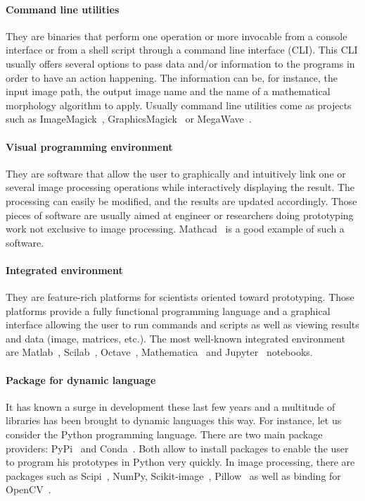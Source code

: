 \paragraph{Command line utilities} They are binaries that perform one operation or more invocable from a console
interface or from a shell script through a command line interface (CLI). This CLI usually offers several options to pass
data and/or information to the programs in order to have an action happening. The information can be, for instance, the
input image path, the output image name and the name of a mathematical morphology algorithm to apply. Usually command
line utilities come as projects such as ImageMagick~\parencite{imagemagick.2021},
GraphicsMagick~\parencite{graphicsmagick.2021} or MegaWave~\parencite{froment.2012.megawave,froment.2004.megawave2}.

\paragraph{Visual programming environment} They are software that allow the user to graphically and intuitively link one
or several image processing operations while interactively displaying the result. The processing can easily be modified,
and the results are updated accordingly. Those pieces of software are usually aimed at engineer or researchers doing
prototyping work not exclusive to image processing. Mathcad~\parencite{ptc.2019.mathcad} is a good example of such a
software.

\paragraph{Integrated environment} They are feature-rich platforms for scientists oriented toward prototyping. Those
platforms provide a fully functional programming language and a graphical interface allowing the user to run commands
and scripts as well as viewing results and data (image, matrices, etc.). The most well-known integrated environment
are Matlab~\parencite{mathworks.2020.matlab}, Scilab~\parencite{scilab.2020}, Octave~\parencite{gnu.2021.octave},
Mathematica~\parencite{wolfram.2020.mathematica} and Jupyter~\parencite{kluyver.2016.jupyter} notebooks.

\paragraph{Package for dynamic language} It has known a surge in development these last few years and a multitude of
libraries has been brought to dynamic languages this way. For instance, let us consider the Python programming language.
There are two main package providers: PyPi~\parencite{pypi.2021} and Conda~\parencite{anaconda.2020}. Both allow to
install packages to enable the user to program his prototypes in Python very quickly. In image processing, there are
packages such as Scipi~\parencite{jones.2006.scipy}, NumPy, Scikit-image~\parencite{vanderwalt.2014.skimage},
Pillow~\parencite{clark.2021.pillow} as well as binding for OpenCV~\parencite{bradski.2000.opencv}.

